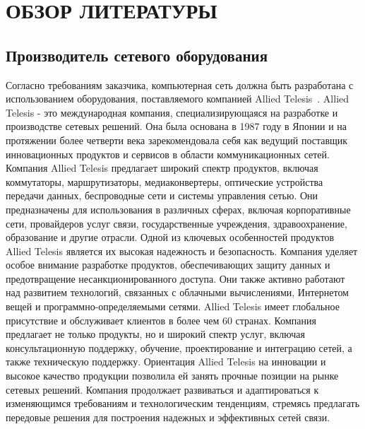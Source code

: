 \section{ОБЗОР ЛИТЕРАТУРЫ}
\label{sec:domain}

\subsection{Производитель сетевого оборудования}
Согласно требованиям заказчика, компьютерная сеть должна быть
разработана с использованием оборудования, поставляемого компанией Allied
Telesis~\cite{base_allied}.
Allied Telesis - это международная компания, специализирующаяся на разработке и производстве сетевых решений.
Она была основана в 1987 году в Японии и на протяжении более четверти века зарекомендовала себя как
ведущий поставщик инновационных продуктов и сервисов в области коммуникационных сетей.
Компания Allied Telesis предлагает широкий спектр продуктов, включая
коммутаторы, маршрутизаторы, медиаконвертеры, оптические устройства
передачи данных, беспроводные сети и системы управления сетью.
Они предназначены для использования в различных сферах, включая корпоративные сети,
провайдеров услуг связи, государственные учреждения, здравоохранение, образование и другие отрасли.
Одной из ключевых особенностей продуктов Allied Telesis является их высокая надежность и безопасность.
Компания уделяет особое внимание
разработке продуктов, обеспечивающих защиту данных и предотвращение несанкционированного доступа.
Они также активно работают над развитием технологий, связанных с облачными вычислениями,
Интернетом вещей и программно-определяемыми сетями.
Allied Telesis имеет глобальное присутствие и обслуживает клиентов в более чем 60 странах.
Компания предлагает не только продукты, но и широкий спектр услуг, включая консультационную поддержку, обучение,
проектирование и интеграцию сетей, а также техническую поддержку.
Ориентация Allied Telesis на инновации и высокое качество продукции
позволила ей занять прочные позиции на рынке сетевых решений.
Компания продолжает развиваться и адаптироваться к изменяющимся требованиям и
технологическим тенденциям, стремясь предлагать передовые решения для
построения надежных и эффективных сетей связи.